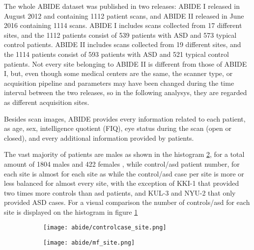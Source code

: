 \documentclass[a4paper,11pt]{article}
\begin{document}
The whole ABIDE dataset was published in two releases: ABIDE I released in August 2012 and containing 1112 patient scans, and ABIDE II released in June 2016 containing 1114 scans.
ABIDE I includes scans collected from 17 different sites, and the 1112 patients consist of 539 patients with ASD and 573 typical control patients.
ABIDE II includes scans collected from 19 different sites, and the 1114 patients consist of 593 patients with ASD and 521 typical control patients.
Not every site belonging to ABIDE II is different from those of ABIDE I, but, even though some medical centers are the same, the scanner type, or acquisition pipeline and parameters may have been changed during the time interval between the two releases, so in the following analysys, they are regarded as different acquisition sites.

Besides scan images, ABIDE provides every information related to each patient, as age, sex, intelligence quotient (FIQ), eye status during the scan (open or closed), and every additional information provided by patients.

The vast majority of patients are males as shown in the histogram \ref{fig:mf_site}, for a total amount of 1804 males and 422 females , while control/asd patient number, for each site is almost  for each site as
while the control/asd case per site is more or less balanced for almost every site, with the exception of KKI-1 that provided two times more controls than asd patients, and KUL-3 and NYU-2 that only provided ASD cases. For a visual comparison the number of controls/asd for each site is displayed on the histogram in figure \ref{fig:controlcase_site}

\begin{figure}[h]
\centering
\begin{subfigure}{0.9\textwidth}
\texttt{[image: abide/controlcase\_site.png]}
\caption{}
\label{fig:controlcase_site}
\end{subfigure}
\begin{subfigure}{0.9\textwidth}
\texttt{[image: abide/mf\_site.png]}
\caption{}
\label{fig:mf_site}
\end{subfigure}
\caption{}
\label{}
\end{figure}
\end{document}
